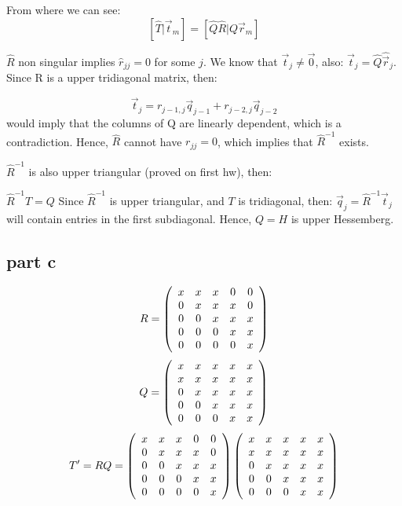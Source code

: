 \documentclass[10pt]{article}
\begin{document}
From where we can see:
\[
 \left[ \hat{T} | \vec{t}_{m} \right]=
  \left[ \hat{Q}\hat{R} | Q\vec{r}_{m} \right]
\]


$\hat{R}$ non singular implies $\hat{r}_{jj} =0$ for some $j$. 
We know that $\vec{t}_j\neq \vec{0}$, also:
$\vec{t}_j = \hat{Q}\hat{\vec{r}}_j$.
Since R is a upper tridiagonal matrix, then:

\[
\vec{t}_j = r_{j-1,j} \vec{q}_{j-1} + r_{j-2,j} \vec{q}_{j-2}
\]
would imply that the columns of Q are linearly dependent, 
which is a contradiction. Hence, $\hat{R}$ cannot have $r_{jj}=0$,
which implies that $\hat{R}^{-1}$ exists. 

$\hat{R}^{-1}$ is also upper triangular (proved on first hw), then:

$\hat{R}^{-1} T = Q$
Since $\hat{R}^{-1}$ is upper triangular, and $T$ is tridiagonal, then:
$\vec{q}_j = \hat{R}^{-1} \vec{t}_j$ will contain entries in the 
first subdiagonal. Hence, $Q=H$ is upper Hessemberg.

\subsection{part c}

\[
  R =   \left(
    \begin{array}{c c c c c}
     x &  x &  x &  0 &  0 \\
     0 &  x &  x &  x &  0 \\
     0 &  0 &  x &  x &  x \\
     0 &  0 &  0 &  x &  x \\
     0 &  0 &  0 &  0 &  x \\
  \end{array}\right)
\]
\[
  Q =   \left(
    \begin{array}{c c c c c}
     x &  x &  x &  x &  x \\
     x &  x &  x &  x &  x \\
     0 &  x &  x &  x &  x \\
     0 &  0 &  x &  x &  x \\
     0 &  0 &  0 &  x &  x \\
  \end{array}\right)
\]
\[
T' = R Q = \left(
    \begin{array}{c c c c c}
     x &  x &  x &  0 &  0 \\
     0 &  x &  x &  x &  0 \\
     0 &  0 &  x &  x &  x \\
     0 &  0 &  0 &  x &  x \\
     0 &  0 &  0 &  0 &  x \\
  \end{array}\right)\left(
    \begin{array}{c c c c c}
     x &  x &  x &  x &  x \\
     x &  x &  x &  x &  x \\
     0 &  x &  x &  x &  x \\
     0 &  0 &  x &  x &  x \\
     0 &  0 &  0 &  x &  x \\
  \end{array}\right)
\]
\end{document}
